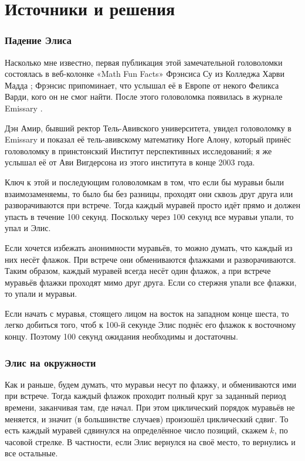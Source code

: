 \section*{Источники и решения}

\subsubsection*{Падение Элиса}

Насколько мне известно, первая публикация этой замечательной головоломки состоялась в веб-колонке «Math Fun Facts» Фрэнсиса Су из Колледжа Харви Мадда \cite{math-fun-facts};
Фрэнсис припоминает, что услышал её в Европе от некого Феликса Варди, кого он не смог найти.
После этого головоломка появилась в журнале Emissary \cite[Весна/Осень 2003]{berlekamp-buhle}.

Дэн Амир, бывший ректор Тель-Авивского университета, увидел головоломку в Emissary и показал её тель-авивскому математику Ноге Алону, который принёс головоломку в принстонский Институт перспективных исследований;
я же услышал её от Ави Вигдерсона из этого института в конце 2003 года.

Ключ к этой и последующим головоломкам в том, что если бы муравьи были взаимозаменяемы, то было бы без разницы, проходят они сквозь друг друга или разворачиваются при встрече.
Тогда каждый муравей просто идёт прямо и должен упасть в течение 100 секунд.
Поскольку через 100 секунд все муравьи упали, то упал и Элис.

Если хочется избежать анонимности муравьёв, то можно думать, что каждый из них несёт флажок.
При встрече они обмениваются флажками и разворачиваются.
Таким образом, каждый муравей всегда несёт один флажок, а при встрече муравьёв флажки проходят мимо друг друга.
Если со стержня упали все флажки, то упали и муравьи.

Если начать с муравья, стоящего лицом на восток на западном конце шеста, то легко добиться того, чтоб к 100-й секунде Элис поднёс его флажок к восточному концу.
Поэтому 100 секунд ожидания необходимы и достаточны.

\subsubsection*{Элис на окружности}

Как и раньше, будем думать, что муравьи несут по флажку, и обмениваются ими при встрече.
Тогда каждый флажок проходит полный круг за заданный период времени, заканчивая там, где начал.
При этом циклический порядок муравьёв не меняется, и значит (в большинстве случаев) произошёл циклический сдвиг.
То есть каждый муравей сдвинулся на определённое число позиций, скажем $k$, по часовой стрелке.
В частности, если Элис вернулся на своё место, то вернулись и все остальные.


